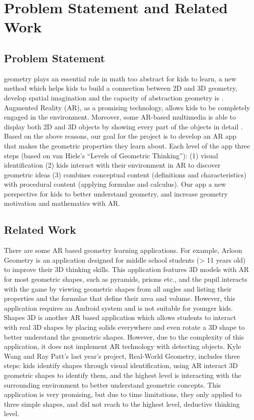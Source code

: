 \documentclass[acmsmall, nonacm]{acmart}
\begin{document}
\section{Problem Statement and Related Work}

\subsection{Problem Statement}

 geometry plays an essential role in
math  too abstract for kids to learn, a
new method which helps kids to build a connection between 2D and 3D geometry,
develop spatial imagination and the capacity of abstraction geometry is
. Augmented Reality (AR), as a promising technology,
allows kids to be completely engaged in the environment. Moreover, some AR-based
multimedia is able to display both 2D and 3D objects by showing every part of
the objects in detail \cite{use-of-geometry-media}.  Based on the above reasons,
our goal for the project is to develop an AR app that makes 
the geometric properties they learn about. Each level of the app
 three steps (based on van Hiele’s “Levels of
Geometric Thinking”): (1) visual identification (2) kids interact with their
environment in AR to discover geometric ideas (3) combines conceptual content
(definitions and characteristics) with procedural content (applying formulae and
calculus). Our app  a new perspective for kids
to better understand geometry, and increase geometry motivation and mathematics
with AR.

\subsection{Related Work}

There are some AR based geometry learning applications. For example, Arloon
Geometry is an application designed for middle school students (> 11 years old)
to improve their 3D thinking skills. This application features 3D models with AR
for most geometric shapes, such as pyramids, prisms etc., and the pupil
interacts with the game by viewing geometric shapes from all angles and listing
their properties and the formulae that define their area and volume. However,
this application requires an Android system and is not suitable for younger
kids. Shapes 3D is another AR based application which allows students to
interact with real 3D shapes by placing solids everywhere and even rotate a 3D
shape to better understand the geometric shapes. However, due to the complexity
of this application, it does not implement AR technology with detecting
objects. Kyle Wang and Ray Patt’s last year’s project, Real-World Geometry,
includes three steps: kids identify shapes through visual identification, using
AR interact 3D geometric shapes to identify them, and the highest level is
interacting with the surrounding environment to better understand geometric
concepts. This application is very promising, but due to time limitations, they
only applied to three simple shapes, and did not reach to the highest level,
deductive thinking level.
\end{document}

